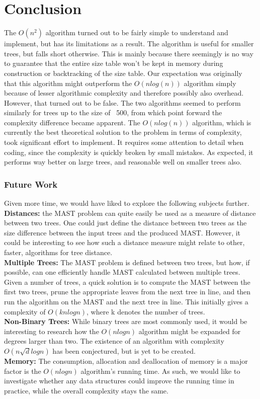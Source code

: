\chapter{Conclusion}
\label{ch:conclusion}
The $O(n^2)$ algorithm turned out to be fairly simple to understand and implement, but has its limitations as a result. The algorithm is useful for smaller trees, but falls short otherwise. This is mainly because there seemingly is no way to guarantee that the entire size table won't be kept in memory during construction or backtracking of the size table. Our expectation was originally that this algorithm might outperform the $O(nlog(n))$ algorithm simply because of lesser algorithmic complexity and therefore possibly also overhead. However, that turned out to be false. The two algorithms seemed to perform similarly for trees up to the size of ~500, from which point forward the complexity difference became apparent.
The $O(nlog(n))$ algorithm, which is currently the best theoretical solution to the problem in terms of complexity, took significant effort to implement. It requires some attention to detail when coding, since the complexity is quickly broken by small mistakes. As expected, it performs way better on large trees, and reasonable well on smaller trees also.

\subsection{Future Work}
Given more time, we would have liked to explore the following subjects further.\\

\noindent\textbf{Distances:} the MAST problem can quite easily be used as a measure of distance between two trees. One could just define the distance between two trees as the size difference between the input trees and the produced MAST. However, it could be interesting to see how such a distance measure might relate to other, faster, algorithms for tree distance. \\ 

\noindent\textbf{Multiple Trees:} The MAST problem is defined between two trees, but how, if possible, can one efficiently handle MAST calculated between multiple trees. Given a number of trees, a quick solution is to compute the MAST between the first two trees, prune the appropriate leaves from the next tree in line, and then run the algorithm on the MAST and the next tree in line. This initially gives a complexity of $O(knlogn)$, where k denotes the number of trees. \\   

\noindent\textbf{Non-Binary Trees:} While binary trees are most commonly used, it would be interesting to research how the $O(nlogn)$ algorithm might be expanded for degrees larger than two. The existence of an algorithm with complexity $O(n\sqrt{d}logn)$ has been conjectured, but is yet to be created. \\

\noindent\textbf{Memory:} The consumption, allocation and deallocation of memory is a major factor is the $O(nlogn)$ algorithm's running time. As such, we would like to investigate whether any data structures could improve the running time in practice, while the overall complexity stays the same. 
